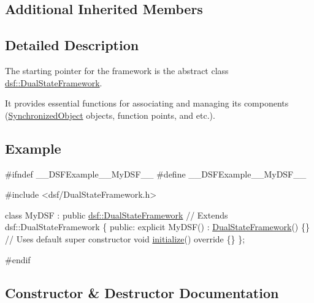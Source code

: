 \subsection*{Additional Inherited Members}


\subsection{Detailed Description}
The starting pointer for the framework is the abstract class \hyperlink{classdsf_1_1_dual_state_framework}{dsf\+::\+Dual\+State\+Framework}. 

It provides essential functions for associating and managing its components (\hyperlink{classdsf_1_1_synchronized_object}{Synchronized\+Object} objects, function points, and etc.). \hypertarget{classdsf_1_1_synchronized_object_eg}{}\subsection{Example}\label{classdsf_1_1_synchronized_object_eg}

\begin{DoxyCodeInclude}
\textcolor{preprocessor}{#ifndef \_\_DSFExample\_\_MyDSF\_\_}
\textcolor{preprocessor}{#define \_\_DSFExample\_\_MyDSF\_\_}

\textcolor{preprocessor}{#include <dsf/DualStateFramework.h>}

\textcolor{keyword}{class }MyDSF : \textcolor{keyword}{public} \hyperlink{classdsf_1_1_dual_state_framework}{dsf::DualStateFramework} \textcolor{comment}{// Extends dsf::DualStateFramework}
\{
\textcolor{keyword}{public}:
    \textcolor{keyword}{explicit} MyDSF() : \hyperlink{classdsf_1_1_dual_state_framework_ab2c3f064dee1876d92694544d032b942}{DualStateFramework}() \{\} \textcolor{comment}{// Uses default super constructor}
    \textcolor{keywordtype}{void} \hyperlink{classdsf_1_1_dual_state_framework_a809a7bba4148e17ea9a43a0a035383ba}{initialize}()\textcolor{keyword}{ override }\{\}
\};

\textcolor{preprocessor}{#endif}
\end{DoxyCodeInclude}
 

\subsection{Constructor \& Destructor Documentation}
\hypertarget{classdsf_1_1_dual_state_framework_ab2c3f064dee1876d92694544d032b942}{}
